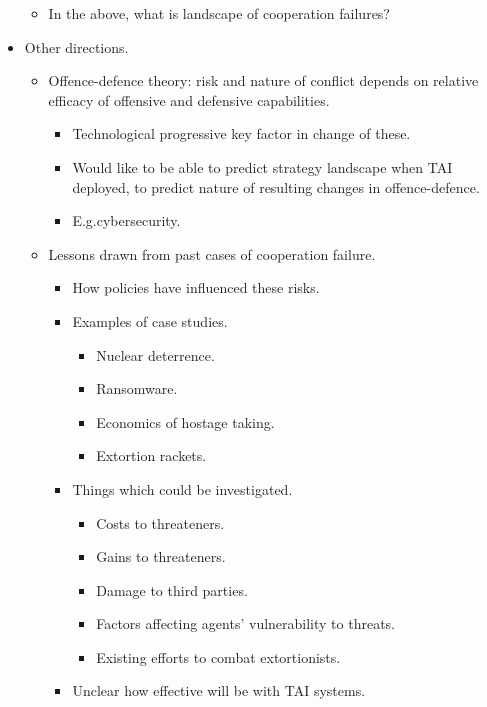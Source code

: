 \begin{itemize}
\begin{itemize}
        \item In the above, what is landscape of cooperation failures?
    \end{itemize}
    \pagebreak
    \item Other directions.
    \begin{itemize}
        \item Offence-defence theory: risk and nature of conflict depends on relative efficacy of offensive and defensive capabilities.
        \begin{itemize}
            \item Technological progressive key factor in change of these.
            \item Would like to be able to predict strategy landscape when TAI deployed, to predict nature of resulting changes in offence-defence.
            \item E.g.\@ cybersecurity.
        \end{itemize}
        \item Lessons drawn from past cases of cooperation failure.
        \begin{itemize}
            \item How policies have influenced these risks.
            \item Examples of case studies.
            \begin{itemize}
                \item Nuclear deterrence.
                \item Ransomware.
                \item Economics of hostage taking.
                \item Extortion rackets.
            \end{itemize}
            \item Things which could be investigated.
            \begin{itemize}
                \item Costs to threateners.
                \item Gains to threateners.
                \item Damage to third parties.
                \item Factors affecting agents' vulnerability to threats.
                \item Existing efforts to combat extortionists.
            \end{itemize}
            \item Unclear how effective will be with TAI systems.

\end{itemize}
\end{itemize}
\end{itemize}
